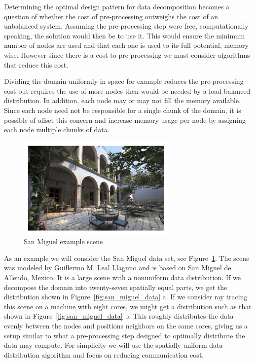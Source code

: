Determining the optimal design pattern for data decomposition becomes a question
of whether the cost of pre-processing outweighs the cost of an unbalanced 
system.  Assuming the pre-processing step were free, computationally speaking, 
the solution would then be to use it.  This would ensure the minimum number of
nodes are used and that each one is used to its full potential, memory wise.  
However since there is a cost to pre-processing we must consider algorithms that
reduce this cost.  

Dividing the domain uniformly in space for example reduces the pre-processing 
cost but requires the use of more nodes then would be needed by a load balanced
distribution.  In addition, each node may or may not fill the memory available. 
Since each node need not be responsible for a single chunk of the domain, it is 
possible of offset this concern and increase memory usage per node by assigning 
each node multiple chunks of data.

\begin{figure}[!htb]
\centering
  \includegraphics[height=5cm]{drawings/sanmiguel_cam25.pdf}
\caption{San Miguel example scene}
\label{fig:san_miguel}
\end{figure}

As an example we will consider the San Miguel data set, see 
Figure~\ref{fig:san_miguel}.  The scene was modeled by Guillermo M. Leal Llaguno
and is based on San Miguel de Allendo, Mexico.  It is a large scene with a 
nonuniform data distribution.  If we decompose the domain into twenty-seven 
spatially equal parts, we get the distribution shown in 
Figure~\ref{fig:san_miguel_data} a.  If we consider ray tracing this scene on a
machine with eight cores, we might get a distribution such as that shown
in Figure~\ref{fig:san_miguel_data} b.   This roughly distributes the data 
evenly between the nodes and positions neighbors on the same cores, giving us a
setup similar to what a pre-processing step designed to optimally distribute the 
data may compute.  For simplicity we will use the spatially uniform data 
distribution algorithm and focus on reducing communication cost.

